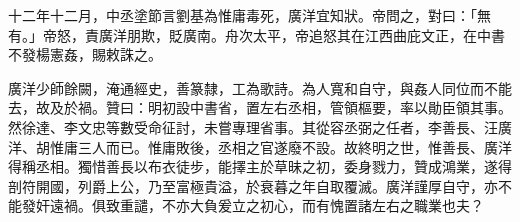 十二年十二月，中丞塗節言劉基為惟庸毒死，廣洋宜知狀。帝問之，對曰：「無有。」帝怒，責廣洋朋欺，貶廣南。舟次太平，帝追怒其在江西曲庇文正，在中書不發楊憲姦，賜敕誅之。

廣洋少師餘闕，淹通經史，善篆隸，工為歌詩。為人寬和自守，與姦人同位而不能去，故及於禍。贊曰：明初設中書省，置左右丞相，管領樞要，率以勛臣領其事。然徐達、李文忠等數受命征討，未嘗專理省事。其從容丞弼之任者，李善長、汪廣洋、胡惟庸三人而已。惟庸敗後，丞相之官遂廢不設。故終明之世，惟善長、廣洋得稱丞相。獨惜善長以布衣徒步，能擇主於草昧之初，委身戮力，贊成鴻業，遂得剖符開國，列爵上公，乃至富極貴溢，於衰暮之年自取覆滅。廣洋謹厚自守，亦不能發奸遠禍。俱致重譴，不亦大負爰立之初心，而有愧置諸左右之職業也夫？


